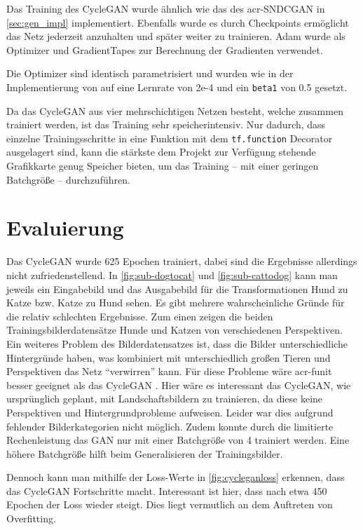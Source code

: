  Das Training des CycleGAN wurde ähnlich wie das des \gls{acr-SNDCGAN} in \cref{sec:gen_impl} implementiert. Ebenfalls wurde es durch Checkpoints ermöglicht das Netz jederzeit anzuhalten und später weiter zu trainieren. Adam \cite{tf:adam} wurde als Optimizer und GradientTapes \cite{tf:gradientape} zur Berechnung der Gradienten verwendet.
 
Die Optimizer sind identisch parametrisiert und wurden wie in der Implementierung von \cite{brownlee_how_2019-1} auf eine Lernrate von 2e-4 und ein \texttt{beta1} von 0.5 gesetzt. 

Da das CycleGAN aus vier mehrschichtigen Netzen besteht, welche zusammen trainiert werden, ist das Training sehr speicherintensiv. Nur dadurch, dass einzelne Trainingsschritte in eine Funktion mit dem \texttt{tf.function} Decorator \cite{noauthor_tffunction_nodate} ausgelagert sind, kann die stärkste dem Projekt zur Verfügung stehende Grafikkarte genug Speicher bieten, um das Training – mit einer geringen Batchgröße – durchzuführen. 


 \section{Evaluierung} %
 
 Das CycleGAN wurde 625 Epochen trainiert, dabei sind die Ergebnisse allerdings nicht 
 zufriedenstellend. In \cref{fig:sub-dogtocat} und \ref{fig:sub-cattodog} kann man jeweils ein 
 Eingabebild und das Ausgabebild für die Transformationen Hund zu Katze bzw. Katze zu Hund 
 sehen. Es gibt mehrere wahrscheinliche Gründe für die relativ schlechten Ergebnisse. Zum einen 
 zeigen die beiden Trainingsbilderdatensätze Hunde und Katzen von verschiedenen Perspektiven. 
 Ein weiteres Problem des Bilderdatensatzes ist, dass die Bilder unterschiedliche Hintergründe 
 haben, was kombiniert mit unterschiedlich großen Tieren und Perspektiven das Netz 
 \enquote{verwirren} kann. Für diese Probleme wäre \gls{acr-funit} besser geeignet als das 
 CycleGAN 
 \cite{liu2019few}. Hier wäre es interessant das CycleGAN, wie ursprünglich geplant, mit
 Landschaftsbildern zu trainieren, da diese keine Perspektiven und Hintergrundprobleme aufweisen. 
 Leider war dies aufgrund fehlender Bilderkategorien nicht möglich. Zudem konnte durch die 
 limitierte Rechenleistung das GAN nur mit einer Batchgröße von 4 trainiert werden. Eine höhere 
 Batchgröße hilft beim Generalisieren der Trainingsbilder. 
 
 Dennoch kann man mithilfe der Loss-Werte in \cref{fig:cycleganloss} erkennen, dass das CycleGAN 
 Fortschritte macht. Interessant ist hier, dass nach etwa 450 Epochen der Loss wieder steigt. Dies 
 liegt vermutlich an dem Auftreten von Overfitting. 


